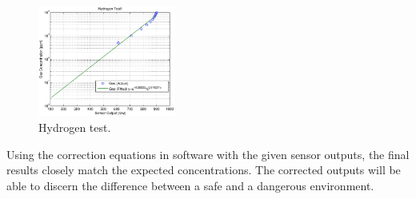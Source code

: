 \begin{figure}
	\centering
	\includegraphics[width=0.4\textwidth]{./matlab/HydrogenTest1.eps}
	\caption{Hydrogen test.}
	\label{fig:hydrogen}
\end{figure}

Using the correction equations in software with the given sensor outputs, the final results closely match the expected concentrations. The corrected outputs will be able to discern the difference between a safe and a dangerous environment. 
